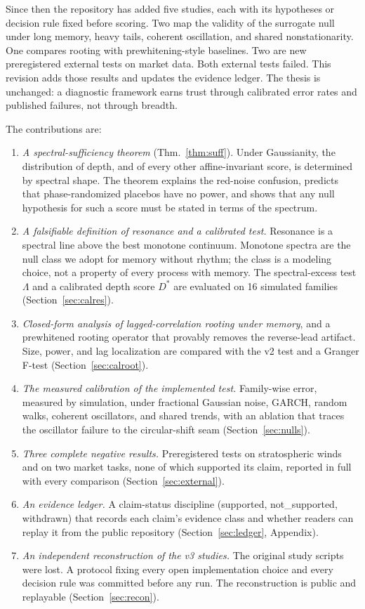 \documentclass[10pt,twocolumn,letterpaper]{article}
\theoremstyle{definition}
\theoremstyle{remark}
\begin{document}
Since then the repository has added five studies, each with its hypotheses or
decision rule fixed before scoring. Two map the validity of the surrogate null
under long memory, heavy tails, coherent oscillation, and shared
nonstationarity. One compares rooting with prewhitening-style baselines. Two
are new preregistered external tests on market data. Both external tests
failed. This revision adds those results and updates the evidence ledger. The
thesis is unchanged: a diagnostic framework earns trust through calibrated
error rates and published failures, not through breadth.

The contributions are:
\begin{enumerate}[label=\textbf{C\arabic*}]
\item \emph{A spectral-sufficiency theorem} (Thm.~\ref{thm:suff}). Under
Gaussianity, the distribution of depth, and of every other affine-invariant
score, is determined by spectral shape. The theorem explains the red-noise
confusion, predicts that phase-randomized placebos have no power, and shows that
any null hypothesis for such a score must be stated in terms of the spectrum.
\item \emph{A falsifiable definition of resonance and a calibrated test.}
Resonance is a spectral line above the best monotone continuum. Monotone
spectra are the null class we adopt for memory without rhythm; the class is a
modeling choice, not a property of every process with memory. The spectral-excess test $\Lambda$ and
a calibrated depth score $D^*$ are evaluated on 16 simulated families
(Section~\ref{sec:calres}).
\item \emph{Closed-form analysis of lagged-correlation rooting under memory},
and a prewhitened rooting operator that provably removes the reverse-lead
artifact. Size, power, and lag localization are compared with the v2 test and a
Granger F-test (Section~\ref{sec:calroot}).
\item \emph{The measured calibration of the implemented test.} Family-wise
error, measured by simulation, under fractional Gaussian noise, GARCH, random walks, coherent
oscillators, and shared trends, with an ablation that traces the oscillator
failure to the circular-shift seam (Section~\ref{sec:nulls}).
\item \emph{Three complete negative results.} Preregistered tests on
stratospheric winds and on two market tasks, none of which supported its claim,
reported in full with every comparison (Section~\ref{sec:external}).
\item \emph{An evidence ledger.} A claim-status discipline (supported,
not\_supported, withdrawn) that records each claim's evidence class and
whether readers can replay it from the public repository
(Section~\ref{sec:ledger}, Appendix).
\item \emph{An independent reconstruction of the v3 studies.} The original
study scripts were lost. A protocol fixing every open implementation choice and
every decision rule was committed before any run. The reconstruction is public
and replayable (Section~\ref{sec:recon}).
\end{enumerate}
\end{document}
